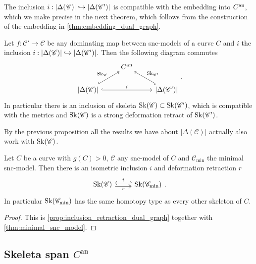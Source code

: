 The inclusion $i: |\Delta(\mathscr C)| \hookrightarrow |\Delta(\mathscr C')|$ is compatible with the embedding into $C{}^{\text{an}}$, which we make precise in the next theorem, which follows from the construction of the embedding in \cref{thm:embedding_dual_graph}.
\begin{proposition}
	Let $f:\mathscr C' \to \mathscr C$ be any dominating map between snc-models of a curve $C$ and $i$ the inclusion $i: |\Delta(\mathscr C)| \hookrightarrow |\Delta(\mathscr C')|$. 
	Then the following diagram commutes \[
	\begin{tikzcd}
		& C\an \\
		{|\Delta(\mathscr C)|} \ar[hookrightarrow]{ur}{\sk_{\mathscr C}}
\ar[hookrightarrow]{rr}{i} & & {|\Delta(\mathscr C')|} \ar[hookrightarrow]{ul}[']{\sk_{\mathscr C'}}
	\end{tikzcd}
	.\] 
	In particular there is an inclusion of skeleta $\operatorname{Sk}(\mathscr C) \subset  \operatorname{Sk}(\mathscr C')$, which is compatible with the metrics and $\operatorname{Sk}(\mathscr C)$ is a strong deformation retract of  $\operatorname{Sk}(\mathscr C')$. 
\end{proposition}

By the previous proposition all the results we have about $|\Delta(\mathscr C)|$ actually also work with  $\operatorname{Sk}(\mathscr C)$. 

\begin{corollary}
	Let $C$ be a curve with  $g(C) > 0$, $\mathscr C$ any snc-model of $C$ and $\mathscr C_\text{min} $ the minimal snc-model. 
	Then there is an isometric inclusion $i$ and deformation retraction $r$
\[
\begin{tikzcd}
	\sk(\mathscr C ) \rar[hookleftarrow, shift left]{i} \rar[twoheadrightarrow, shift right, ']{r} & \sk(\mathscr C_\text{min} ) 
\end{tikzcd}
.\] 
In particular $\operatorname{Sk}(\mathscr C_\text{min} )$ has the same homotopy type as every other skeleton of $C$. 
\end{corollary}
\begin{proof}
	This is \cref{prop:inclusion_retraction_dual_graph} together with \cref{thm:minimal_snc_model}.
\end{proof}

\subsection{Skeleta span $C^{\mathrm{an}}$} \label{sec:skeleta_span_C_an}

